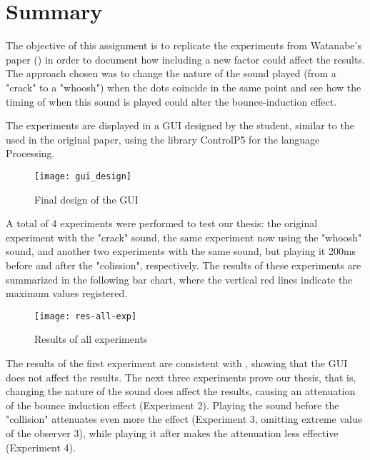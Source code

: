 \section{Summary}
 The objective of this assignment is to replicate the experiments from Watanabe's paper (\cite{watanabe2001}) in order to document how including a new factor could affect the results. The approach chosen was to change the nature of the sound played (from a "crack" to a "whoosh") when the dots coincide in the same point and see how the timing of when this sound is played could alter the bounce-induction effect.

The experiments are displayed in a GUI designed by the student, similar to the used in the original paper, using the library ControlP5 for the language Processing. 

\begin{figure}[!ht]
		\centering
		\vspace{0.5cm}
		\texttt{[image: gui\_design]}
		\caption{Final design of the GUI}
\end{figure} 

A total of 4 experiments were performed to test our thesis: the original experiment with the "crack" sound, the same experiment now using the "whoosh" sound, and another two experiments with the same sound, but playing it 200ms before and after the "colission", respectively. The results of these experiments are summarized in the following bar chart, where the vertical red lines indicate the maximum values registered. 

\begin{figure}[!ht]
		\centering
		\vspace{0.5cm}
		\texttt{[image: res-all-exp]}
		\caption{Results of all experiments}
\end{figure} 

The results of the first experiment are consistent with \cite{watanabe2001}, showing that the GUI does not affect the results. The next three experiments prove our thesis, that is, changing the nature of the sound does affect the results, causing an attenuation of the bounce induction effect (Experiment 2). Playing the sound before the "collision" attenuates even more the effect (Experiment 3, omitting extreme value of the observer 3), while playing it after makes the attenuation less effective (Experiment 4). 